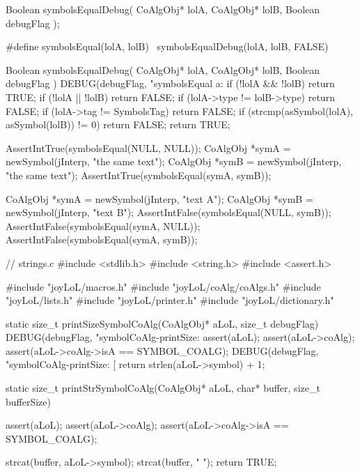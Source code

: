 
\startCHeader
Boolean symbolsEqualDebug(
  CoAlgObj* lolA,
  CoAlgObj* lolB,
  Boolean debugFlag
);

#define symbolsEqual(lolA, lolB) \
  symbolsEqualDebug(lolA, lolB, FALSE)
\stopCHeader

\startCCode
Boolean symbolsEqualDebug(
  CoAlgObj* lolA,
  CoAlgObj* lolB,
  Boolean debugFlag
) {
  DEBUG(debugFlag, "symbolsEqual a:%
  if (!lolA && !lolB) return TRUE;
  if (!lolA || !lolB) return FALSE;
  if (lolA->type != lolB->type) return FALSE;
  if (lolA->tag != SymbolsTag) return FALSE;
  if (strcmp(asSymbol(lolA), asSymbol(lolB)) != 0) return FALSE;
  return TRUE;
}
\stopCCode


\startCTest
  AssertIntTrue(symbolsEqual(NULL, NULL));
  CoAlgObj *symA = newSymbol(jInterp, "the same text");
  CoAlgObj *symB = newSymbol(jInterp, "the same text");
  AssertIntTrue(symbolsEqual(symA, symB));
\stopCTest
\stopTestCase


\startCTest
  CoAlgObj *symA = newSymbol(jInterp, "text A");
  CoAlgObj *symB = newSymbol(jInterp, "text B");
  AssertIntFalse(symbolsEqual(NULL, symB));
  AssertIntFalse(symbolsEqual(symA, NULL));
  AssertIntFalse(symbolsEqual(symA, symB));
\stopCTest
\stopTestCase
\stopTestSuite

\starttyping
// strings.c
#include <stdlib.h>
#include <string.h>
#include <assert.h>

#include "joyLoL/macros.h"
#include "joyLoL/coAlg/coAlgs.h"
#include "joyLoL/lists.h"
#include "joyLoL/printer.h"
#include "joyLoL/dictionary.h"

static size_t printSizeSymbolCoAlg(CoAlgObj* aLoL, size_t debugFlag) {
  DEBUG(debugFlag, "symbolCoAlg-printSize: %
  assert(aLoL);
  assert(aLoL->coAlg);
  assert(aLoL->coAlg->isA == SYMBOL_COALG);
  DEBUG(debugFlag, "symbolCoAlg-printSize: [%
  return strlen(aLoL->symbol) + 1;
}

static size_t printStrSymbolCoAlg(CoAlgObj* aLoL,
                                  char* buffer, size_t bufferSize) {
  assert(aLoL);
  assert(aLoL->coAlg);
  assert(aLoL->coAlg->isA == SYMBOL_COALG);

  strcat(buffer, aLoL->symbol);
  strcat(buffer, " ");
  return TRUE;
}
\stoptyping

